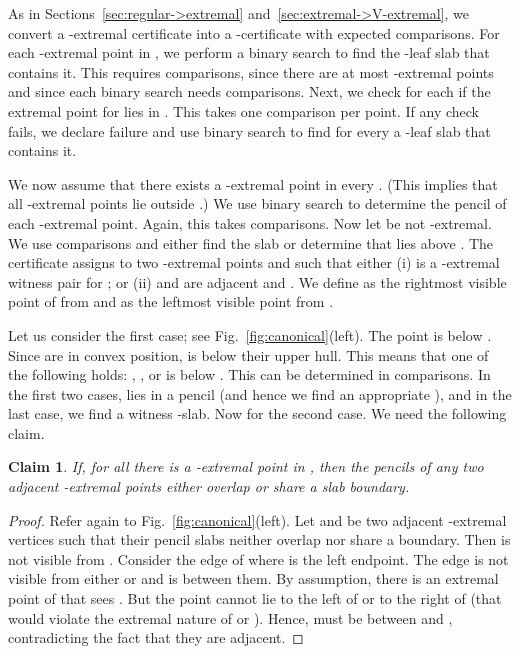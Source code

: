 \documentclass[letterpaper,11pt]{article}
\newtheorem{claim}[theorem]{Claim}
\begin{document}
As in Sections~\ref{sec:regular->extremal} 
and~\ref{sec:extremal->V-extremal}, we convert a
-extremal certificate 
into a -certificate with  
expected comparisons.
For each -extremal point in 
, we perform a binary search to 
find the -leaf slab that contains 
it. This requires  comparisons, 
since there are at most  
-extremal points and 
since each binary search needs 
 comparisons. Next, we 
check for each  if 
the extremal point for  lies 
in . This takes one 
comparison per point. If any check 
fails, we declare failure and use 
binary search to find for every 
 a -leaf slab that 
contains it.

We now assume that there exists a 
-extremal point
in every . (This implies 
that all -extremal points
lie outside .) We use binary search 
to determine the pencil of each 
-extremal point. Again, 
this takes  comparisons.
Now let  be not 
-extremal. We use  
comparisons and either find the slab 
or determine that  lies above .
The certificate  assigns to 
 two -extremal points 
 and  such that either 
(i)  is a 
-extremal witness pair 
for ; or (ii)  and  
are adjacent and 
. 
We define  as the rightmost
visible point of  from  
and  as the leftmost visible
point from . 

Let us consider the first case; see 
Fig.~\ref{fig:canonical}(left). The
point  is below . 
Since  are in 
convex position,  is 
below their upper hull.
This means that one of the following 
holds:
, 
, or 
is below . 
This can be determined in 
comparisons. In the first two 
cases,  lies in a pencil (and 
hence we find an appropriate ),
and in the last case, we find a 
witness -slab. Now for the second case. 
We need the following claim.

\begin{claim}\label{clm:overlap}
  If, for all  there 
  is a -extremal 
  point in , then the 
  pencils of any two adjacent 
  -extremal points 
  either overlap or share a slab boundary.
\end{claim}

\begin{proof} 
Refer again to 
Fig.~\ref{fig:canonical}(left). 
Let  and  be two adjacent 
-extremal vertices 
such that their pencil slabs neither 
overlap nor share a boundary. Then 
 is not visible from . 
Consider the edge  of  
where  is the left endpoint. 
The edge  is not visible from 
either  or  and is 
between them. By assumption, 
there is an extremal point 
 of  that sees . But 
the point  cannot lie to the 
left of  or to the right 
of  (that would violate the 
extremal nature of  or ). 
Hence,  must be between  and 
, contradicting the fact that 
they are adjacent.
\end{proof}
\end{document}
